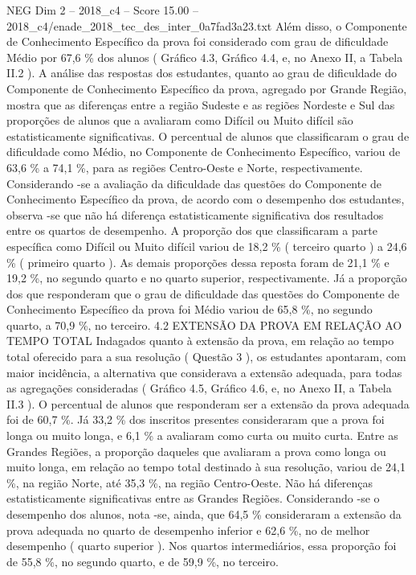 \begin{textsample}{NEG Dim 2 – 2018\_c4 – Score 15.00 – 2018\_c4/enade\_2018\_tec\_des\_inter\_0a7fad3a23.txt}
Além disso, o Componente de Conhecimento Específico da prova foi considerado com grau de dificuldade Médio por 67,6 \% dos alunos ( Gráfico 4.3, Gráfico 4.4, e, no Anexo II, a Tabela II.2 ).
A análise das respostas dos estudantes, quanto ao grau de dificuldade do Componente de Conhecimento Específico da prova, agregado por Grande Região, mostra que as diferenças entre a região Sudeste e as regiões Nordeste e Sul das proporções de alunos que a avaliaram como Difícil ou Muito difícil são estatisticamente significativas.
O percentual de alunos que classificaram o grau de dificuldade como Médio, no Componente de Conhecimento Específico, variou de 63,6 \% a 74,1 \%, para as regiões Centro-Oeste e Norte, respectivamente.
Considerando -se a avaliação da dificuldade das questões do Componente de Conhecimento Específico da prova, de acordo com o desempenho dos estudantes, observa -se que não há diferença estatisticamente significativa dos resultados entre os quartos de desempenho.
A proporção dos que classificaram a parte específica como Difícil ou Muito difícil variou de 18,2 \% ( terceiro quarto ) a 24,6 \% ( primeiro quarto ).
As demais proporções dessa reposta foram de 21,1 \% e 19,2 \%, no segundo quarto e no quarto superior, respectivamente.
Já a proporção dos que responderam que o grau de dificuldade das questões do Componente de Conhecimento Específico da prova foi Médio variou de 65,8 \%, no segundo quarto, a 70,9 \%, no terceiro. 4.2 EXTENSÃO DA PROVA EM RELAÇÃO AO TEMPO TOTAL Indagados quanto à extensão da prova, em relação ao tempo total oferecido para a sua resolução ( Questão 3 ), os estudantes apontaram, com maior incidência, a alternativa que considerava a extensão adequada, para todas as agregações consideradas ( Gráfico 4.5, Gráfico 4.6, e, no Anexo II, a Tabela II.3 ).
O percentual de alunos que responderam ser a extensão da prova adequada foi de 60,7 \%.
Já 33,2 \% dos inscritos presentes consideraram que a prova foi longa ou muito longa, e 6,1 \% a avaliaram como curta ou muito curta.
Entre as Grandes Regiões, a proporção daqueles que avaliaram a prova como longa ou muito longa, em relação ao tempo total destinado à sua resolução, variou de 24,1 \%, na região Norte, até 35,3 \%, na região Centro-Oeste.
Não há diferenças estatisticamente significativas entre as Grandes Regiões.
Considerando -se o desempenho dos alunos, nota -se, ainda, que 64,5 \% consideraram a extensão da prova adequada no quarto de desempenho inferior e 62,6 \%, no de melhor desempenho ( quarto superior ).
Nos quartos intermediários, essa proporção foi de 55,8 \%, no segundo quarto, e de 59,9 \%, no terceiro.

\end{textsample}
